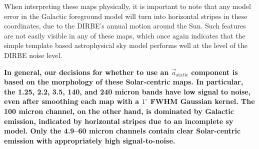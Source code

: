 \documentclass{aa}
\renewcommand{\a}[0]{\vec{a}}
\begin{document}
{When interpreting these maps physically, it is important to
  note that any model error in the Galactic foreground model will turn
  into horizontal stripes in these coordinates, due to the DIRBE's
  annual motion around the Sun. Such features are not easily visible
  in any of these maps, which once again indicates that the simple
  template based astrophysical sky model performs well at the level of
  the DIRBE noise level.}


\textbf{In general, our decisions for whether to use an $\a_{\mathrm{static}}$ component is based on the morphology of these Solar-centric maps. In particular, the 1.25, 2.2, 3.5, 140, and 240  micron bands have low signal to noise, even after smoothing each map with a $1^\circ$ FWHM Gaussian kernel. The 100 micron channel, on the other hand, is dominated by Galactic emission, indicated by horizontal stripes due to an incomplete sy model. Only the 4.9--60 micron channels contain clear Solar-centric emission with appropriately high signal-to-noise.
}
\end{document}
